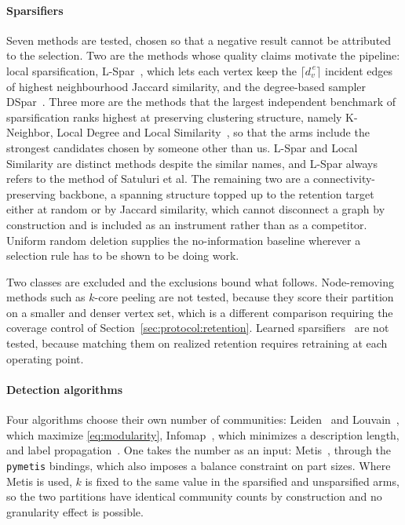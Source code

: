 \paragraph{Sparsifiers}
Seven methods are tested, chosen so that a negative result cannot be attributed
to the selection. Two are the methods whose quality claims motivate the pipeline:
local sparsification, L-Spar~\cite{satuluri2011local}, which lets each vertex keep
the $\lceil d_v^{\,e} \rceil$ incident edges of highest neighbourhood Jaccard
similarity, and the degree-based sampler DSpar~\cite{liu2023dspar}. Three more
are the methods that the largest independent benchmark of sparsification ranks
highest at preserving clustering structure, namely K-Neighbor, Local Degree and
Local Similarity~\cite{chen2024demystifying, hamann2016structure}, so that the
arms include the strongest candidates chosen by someone other than us. L-Spar and
Local Similarity are distinct methods despite the similar names, and L-Spar
always refers to the method of Satuluri et al. The remaining two are a
connectivity-preserving backbone, a spanning structure topped up to the retention
target either at random or by Jaccard similarity, which cannot disconnect a graph
by construction and is included as an instrument rather than as a competitor.
Uniform random deletion supplies the no-information baseline wherever a selection
rule has to be shown to be doing work.

Two classes are excluded and the exclusions bound what follows. Node-removing
methods such as $k$-core peeling are not tested, because they score their
partition on a smaller and denser vertex set, which is a different comparison
requiring the coverage control of Section~\ref{sec:protocol:retention}. Learned
sparsifiers~\cite{wu2020gsgan} are not tested, because matching them on realized
retention requires retraining at each operating point.

\paragraph{Detection algorithms}
Four algorithms choose their own number of communities:
Leiden~\cite{traag2019louvain} and Louvain~\cite{blondel2008fast}, which maximize
\eqref{eq:modularity}, Infomap~\cite{rosvall2008maps}, which minimizes a
description length, and label propagation~\cite{raghavan2007near}. One takes the
number as an input: Metis~\cite{karypis1998metis}, through the \texttt{pymetis}
bindings, which also imposes a balance constraint on part sizes. Where Metis is
used, $k$ is fixed to the same value in the sparsified and unsparsified arms, so
the two partitions have identical community counts by construction and no
granularity effect is possible.

